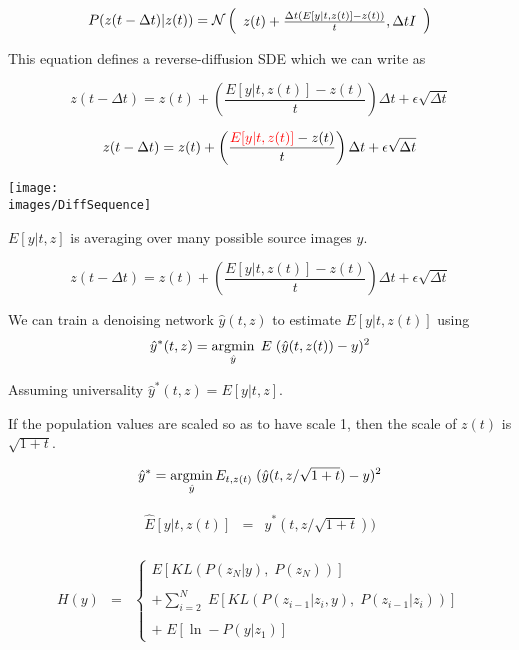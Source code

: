 {

$$P(z(t - \Delta t)|z(t)) = {\cal N}\left(\begin{array}{l} z(t) + \frac{\Delta t(E[y|t,z(t)] - z(t))}{t}, \Delta t I\end{array}\right)$$

\vfill
This equation defines a reverse-diffusion SDE which we can write as

{\huge
$$z(t - \Delta t) = z(t) + \left(\frac{E[y|t,z(t)] - z(t)}{t}\right)\Delta t +  \epsilon\sqrt{\Delta t}$$
}


{\huge
$$z(t - \Delta t) = z(t) + \left(\frac{{\color{red} E[y|t,z(t)]} - z(t)}{t}\right)\Delta t +  \epsilon\sqrt{\Delta t}$$
}

\vfill
\centerline{\texttt{[image: \\images/DiffSequence]}}

\vfill
$E[y|t,z]$ is averaging over many possible source images $y$.


$$z(t - \Delta t) = z(t) + \left(\frac{E[y|t,z(t)] - z(t)}{t}\right)\Delta t +  \epsilon\sqrt{\Delta t}$$

\vfill
We can train a denoising network $\hat{y}(t,z)$ to estimate $E[y|t,z(t)]$ using
$$\hat{y}^*(t,z) = \operatorname*{argmin}_{\hat{y}} \;E \;(\hat{y}(t,z(t)) - y)^2$$


\vfill
Assuming universality $\hat{y}^*(t,z) = E[y|t,z]$.


\vfill
If the population values are scaled so as to have scale 1, then the scale of $z(t)$ is $\sqrt{1+t}$.

\vfill
$$\hat{y}^* = \operatorname*{argmin}_{\hat{y}} E_{t,z(t)} \; (\hat{y}(t,z/\sqrt{1+t}) - y)^2$$

\vfill
\begin{eqnarray*}
\hat{E}[y|t,z(t)] & = & \hat{y}^*(t,z/\sqrt{1+t})) \\
\end{eqnarray*}


{\huge
\begin{eqnarray*}
  H(y) & = & \left\{\begin{array}{l} E[KL(P(z_N|y),\;P(z_N))] \\ \\ + \sum_{i=2}^N  \; E[KL(P(z_{i-1}|z_i,y),\;P(z_{i-1}|z_i))] \\ \\ +\;E[\ln -P(y|z_1)] \end{array}\right.
  \end{eqnarray*}

}}
